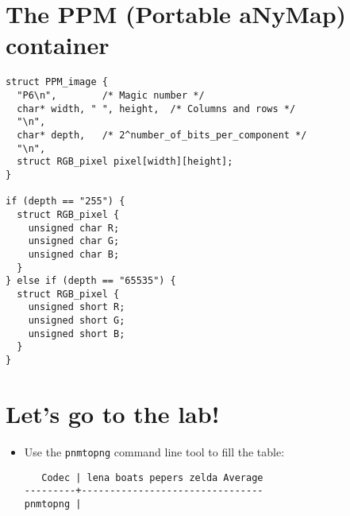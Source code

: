 \section*{The PPM (Portable aNyMap) container}

\begin{verbatim}
struct PPM_image {
  "P6\n",        /* Magic number */
  char* width, " ", height,  /* Columns and rows */
  "\n",
  char* depth,   /* 2^number_of_bits_per_component */
  "\n",
  struct RGB_pixel pixel[width][height];
}

if (depth == "255") {
  struct RGB_pixel {
    unsigned char R;
    unsigned char G;
    unsigned char B;
  }
} else if (depth == "65535") {
  struct RGB_pixel {
    unsigned short R;
    unsigned short G;
    unsigned short B;
  }
}
\end{verbatim}


\section*{Let's go to the lab!}
\begin{itemize}
\item Use the \texttt{pnmtopng} command line tool to fill the table:
\begin{verbatim}
   Codec | lena boats pepers zelda Average
---------+--------------------------------
pnmtopng | 
\end{verbatim}
\end{itemize}



